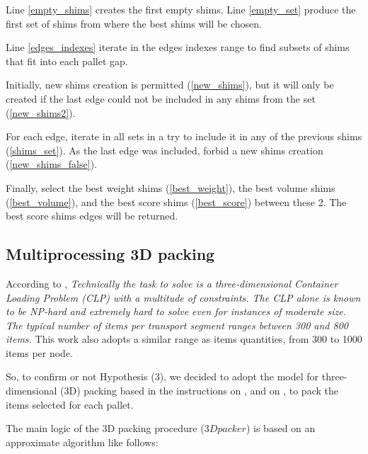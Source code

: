 \documentclass[preprint,authoryear]{elsarticle}
\begin{document}
Line \ref{empty_shims} creates the first empty shims.
Line \ref{empty_set} produce the first set of shims from where the best shims will be chosen.

Line \ref{edges_indexes} iterate in the edges indexes range to find subsets of shims that fit into each pallet gap.

Initially, new shims creation is permitted (\ref{new_shims}), but it will only be created if the last edge could not be included in any shims from the set (\ref{new_shims2}). 

For each edge, iterate in all sets in a try to include it in any of the previous shims (\ref{shims_set}).
As the last edge was included, forbid a new shims creation (\ref{new_shims_false}).

Finally, select the best weight shims (\ref{best_weight}), the best volume shims (\ref{best_volume}), and the best score shims (\ref{best_score}) between these 2. The best score shims edges will be returned.


\subsection{Multiprocessing 3D packing}

According to \cite{BrandtStefan2019}, {\it Technically the task to solve is a three-dimensional Container Loading Problem (CLP) with a multitude of constraints. The CLP alone is known to be NP-hard and extremely hard to solve even for instances of moderate size. The typical number of items per transport segment ranges between 300 and 800 items.} This work also adopts a similar range as items quantities, from 300 to 1000 items per node.

So, to confirm or not Hypothesis (3), we decided to adopt the model for three-dimensional (3D) packing based in the instructions on \cite{DubeKanavathy2006}, \cite{li2014} and on \cite{PaquayLimbourgSchynsOliveira2018}, to pack the items selected for each pallet.

The main logic of the 3D packing procedure ($3Dpacker$) is based on an approximate algorithm like follows:
\end{document}
